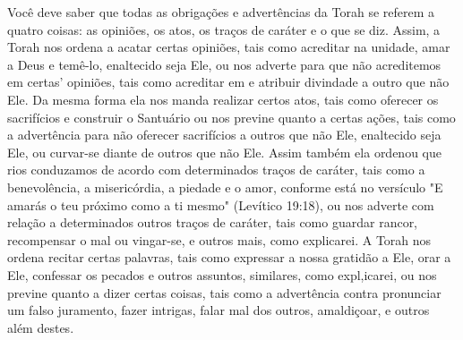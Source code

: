 \begin{itemize}
\begin{enumrate}
Você deve saber que todas as obrigações e advertências da Torah se
referem a quatro coisas: as opiniões, os atos, os traços de caráter e o
que se diz. Assim, a Torah nos ordena a acatar certas opiniões, tais
como acreditar na unidade, amar a Deus e temê-lo, enaltecido seja Ele,
ou nos adverte para que não acreditemos em certas' opiniões, tais como
acreditar em e atribuir divinda­de a outro que não Ele. Da mesma forma
ela nos manda realizar certos atos, tais como oferecer os sacrifícios e
construir o Santuário ou nos previne quanto a certas ações, tais como a
advertência para não oferecer sacrifícios a outros que não Ele,
enaltecido seja Ele, ou curvar-se diante de outros que não Ele. As­sim
também ela ordenou que rios conduzamos de acordo com determinados traços
de caráter, tais como a benevolência, a misericórdia, a piedade e o
amor, conforme está no versículo "E amarás o teu próximo como a ti
mesmo" (Leví­tico 19:18), ou nos adverte com relação a determinados
outros traços de cará­ter, tais como guardar rancor, recompensar o mal
ou vingar-se, e outros mais, como explicarei. A Torah nos ordena recitar
certas palavras, tais como expres­sar a nossa gratidão a Ele, orar a
Ele, confessar os pecados e outros assuntos, similares, como 
expl,icarei, ou nos previne quanto a dizer certas
coisas, tais co­mo a advertência contra pronunciar um falso juramento,
fazer intrigas, falar mal dos outros, amaldiçoar, e outros além destes.


\end{enumrate}
\end{itemize}
